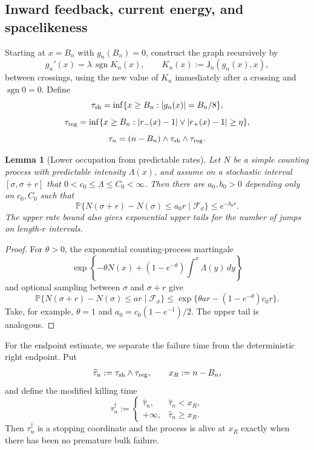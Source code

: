 \documentclass[11pt,reqno]{amsart}
\newtheorem{lemma}[theorem]{Lemma}
\theoremstyle{definition}
\theoremstyle{remark}
\numberwithin{equation}{section}
\newcommand{\Pp}{\mathbb P}
\newcommand{\sgn}{\operatorname{sgn}}
\begin{document}
\subsection{Inward feedback, current energy, and spacelikeness}

Starting at \(x=B_n\) with \(g_n(B_n)=0\), construct the graph recursively
by
\begin{equation}
g_n'(x)=\lambda\,\sgn K_n(x),
\qquad
K_n(x):=\mathsf J_n(g_n(x),x),
\label{eq:1.17}
\end{equation}
between crossings, using the new value of \(K_n\) immediately after a
crossing and \(\sgn0=0\).  Define
\[
\tau_{\rm sh}
=
\inf\{x\ge B_n:|g_n(x)|=B_n/8\},
\]
\[
\tau_{\rm reg}
=
\inf\{x\ge B_n:|r_-(x)-1|\vee|r_+(x)-1|\ge\eta\},
\]
\begin{equation}
\tau_n
=
(n-B_n)\wedge\tau_{\rm sh}\wedge\tau_{\rm reg}.
\label{eq:1.18}
\end{equation}

\begin{lemma}[Lower occupation from predictable rates]
\label{lem:occupation}
Let \(N\) be a simple counting process with predictable intensity
\(\Lambda(x)\), and assume on a stochastic interval
\([\sigma,\sigma+r]\) that
\(0<c_0\le\Lambda\le C_0<\infty\).  Then there are \(a_0,b_0>0\)
depending only on \(c_0,C_0\) such that
\begin{equation}
\Pp\{N(\sigma+r)-N(\sigma)\le a_0r\mid\mathcal F_\sigma\}
\le e^{-b_0r}.
\label{eq:1.19}
\end{equation}
The upper rate bound also gives exponential upper tails for the number
of jumps on length-\(r\) intervals.
\end{lemma}

\begin{proof}
For \(\theta>0\), the exponential counting-process martingale
\[
\exp\left\{-\theta N(x)
+(1-e^{-\theta})\int^x\Lambda(y)\,dy\right\}
\]
and optional sampling between \(\sigma\) and \(\sigma+r\) give
\[
\Pp\{N(\sigma+r)-N(\sigma)\le ar\mid\mathcal F_\sigma\}
\le
\exp\{\theta ar-(1-e^{-\theta})c_0r\}.
\]
Take, for example, \(\theta=1\) and
\(a_0=c_0(1-e^{-1})/2\).  The upper tail is analogous.
\end{proof}

For the endpoint estimate, we separate the failure time from the
deterministic right endpoint.  Put
\begin{equation}
\widehat\tau_n:=\tau_{\rm sh}\wedge\tau_{\rm reg},
\qquad x_R:=n-B_n,
\label{eq:1.18a}
\end{equation}
and define the modified killing time
\begin{equation}
\tau_n^\dagger:=
\begin{cases}
\widehat\tau_n,&\widehat\tau_n<x_R,\\
+\infty,&\widehat\tau_n\ge x_R.
\end{cases}
\label{eq:1.18b}
\end{equation}
Then \(\tau_n^\dagger\) is a stopping coordinate and the process is
alive at \(x_R\) exactly when there has been no premature bulk failure.
\end{document}
